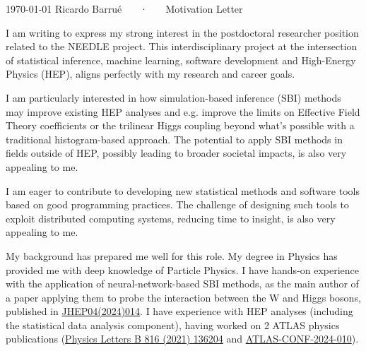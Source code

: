 \documentclass[11pt, a4paper]{awesome-cv}
\begin{document}
\makecvheader[R]

\makecvfooter
  {\today}
  {Ricardo Barrué ~~~·~~~ Motivation Letter}
  {}

\makelettertitle

\begin{cvletter}

I am writing to express my strong interest in the postdoctoral researcher position related to the NEEDLE project. This interdisciplinary project at the intersection of statistical inference, machine learning, software development and High-Energy Physics (HEP), aligns perfectly with my research and career goals.

I am particularly interested in how simulation-based inference (SBI) methods may improve existing HEP analyses and e.g. improve the limits on Effective Field Theory coefficients or the trilinear Higgs coupling beyond what's possible with a traditional histogram-based approach. The potential to apply SBI methods in fields outside of HEP, possibly leading to broader societal impacts, is also very appealing to me.

I am eager to contribute to developing new statistical methods and software tools based on good programming practices. The challenge of designing such tools to exploit distributed computing systems, reducing time to insight, is also very appealing to me.

My background has prepared me well for this role. My degree in Physics has provided me with deep knowledge of Particle Physics. I have hands-on experience with the application of neural-network-based SBI methods, as the main author of a paper applying them to probe the interaction between the W and Higgs bosons, published in \href{http://dx.doi.org/10.1007/JHEP04(2024)014}{JHEP04(2024)014}. I have experience with HEP analyses (including the statistical data analysis component), having worked on 2 ATLAS physics publications (\href{https://doi.org/10.1016/j.physletb.2021.136204}{Physics Letters B 816 (2021) 136204} and \href{https://atlas.web.cern.ch/Atlas/GROUPS/PHYSICS/CONFNOTES/ATLAS-CONF-2024-010/}{ATLAS-CONF-2024-010}).


\end{cvletter}
\end{document}
